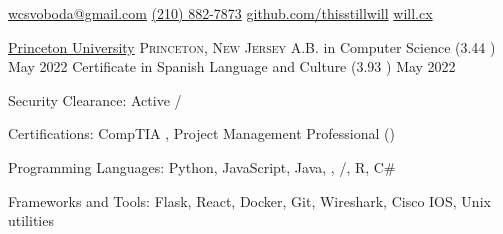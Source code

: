 \documentclass[10pt,letterpaper]{article}
\begin{document}
\sloppy


\nobreakvspace{0.3em}

\noindent\href{mailto:wcsvoboda.at.gmail.dot.com}{wcsvoboda\mbox{}@\mbox{}gmail.com}\sbull
\href{tel:2108827873}{(210) 882-7873}\sbull
\href{https://github.com/thisstillwill}{github.com/thisstillwill}\sbull
\href{https://will.cx}{will.cx}

\spacedhrule{0.9em}{-0.4em}


\headedsection
  {\href{https://www.princeton.edu/}{Princeton University}}
  {\textsc{Princeton, New Jersey}} {%
  \headedsubsection
    {A.B. in Computer Science \textnormal{(3.44 )}}
    {May 2022}
    {}
  \headedsubsection
    {Certificate in Spanish Language and Culture \textnormal{(3.93 )}}
    {May 2022}{}
}


\spacedhrule{0.5em}{-0.4em}


\inlineheadsection
  {Security Clearance:}
  {Active /}

\inlineheadsection
  {Certifications:}
  {CompTIA \SP, Project Management Professional ()}

\inlineheadsection
  {Programming Languages:}
  {Python, JavaScript, Java, , /, R, C\#}

\inlineheadsection
  {Frameworks and Tools:}
  {Flask, React, Docker, Git, Wireshark, Cisco IOS, Unix utilities}
\end{document}
